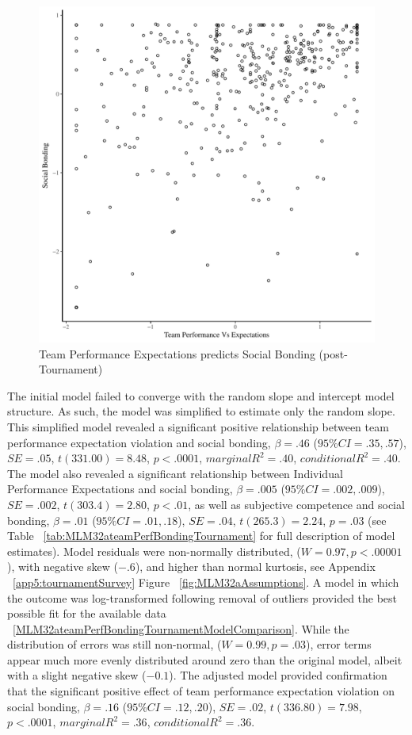   \begin{figure}[htbp]
    \centering
  \includegraphics[scale=.5]{images/teamPerfBondOverallBasicXY.pdf}
    \caption{Team Performance Expectations predicts Social Bonding (post-Tournament)}
    \label{fig:teamPerfBondOverallBasicXY}
  \end{figure}


  The initial model failed to converge with the random slope and intercept model structure.  As such, the model was simplified to estimate only the random slope. This simplified model revealed a significant positive relationship between team performance expectation violation and social bonding, $\beta = .46$ ($95\% CI =  .35, .57$), $SE = .05$, $t(331.00) = 8.48$, $p < .0001$, $marginal R^2 = .40$, $conditional R^2 = .40$.
  The model also revealed a significant relationship between Individual Performance Expectations and social bonding, $\beta = .005$ ($95\% CI =  .002, .009$), $SE = .002$, $t(303.4) = 2.80$, $p < .01$, as well as subjective competence and social bonding, $\beta = .01$ ($95\% CI =  .01, .18$), $SE = .04$, $t(265.3) = 2.24$, $p = .03$ (see Table ~\ref{tab:MLM32ateamPerfBondingTournament} for full description of model estimates).  Model residuals were non-normally distributed, ($W = 0.97, p < .00001$), with negative skew ($-.6$), and higher than normal kurtosis, see Appendix ~\ref{app5:tournamentSurvey} Figure ~\ref{fig:MLM32aAssumptions}.  A model in which the outcome was log-transformed following removal of outliers provided the best possible fit for the available data ~\ref{MLM32ateamPerfBondingTournamentModelComparison}. While the distribution of errors was still non-normal, ($W = 0.99, p = .03$),  error terms appear much more evenly distributed around zero than the original model, albeit with a slight negative skew ($-0.1$).
  The adjusted model provided confirmation that the significant positive effect of team performance expectation violation on social bonding,  $\beta = .16$ ($95\% CI =  .12, .20$), $SE = .02$, $t(336.80) = 7.98$, $p < .0001$, $marginal R^2 = .36$, $conditional R^2 = .36$.

